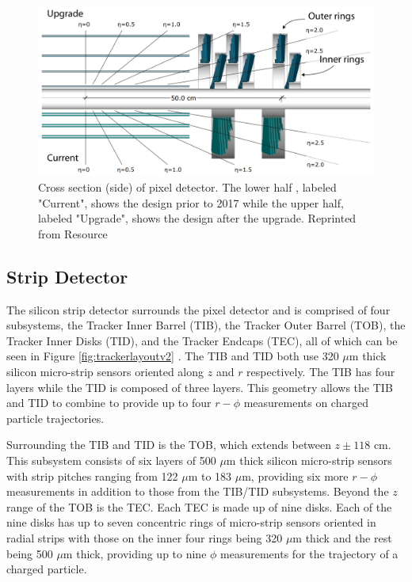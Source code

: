 \begin{figure}[h]
	\centering
	\includegraphics[width=1.0\linewidth]{Figures/Tracker_sideview}
	\caption{Cross section (side) of pixel detector. The lower half , labeled "Current", shows the design prior to 2017 while the upper half, labeled "Upgrade", shows the design after the upgrade. Reprinted from Resource \cite{Dominguez:1481838}}
	\label{fig:trackersideview}
\end{figure}

\subsection{Strip Detector}
The silicon strip detector surrounds the pixel detector and is comprised of four subsystems, the Tracker Inner Barrel (TIB), the Tracker Outer Barrel (TOB), the Tracker Inner Disks (TID), and the Tracker Endcaps (TEC), all of which can be seen in Figure \ref{fig:trackerlayoutv2} \cite{Collaboration_2008}. The TIB and TID both use 320 $\mu$m thick silicon micro-strip sensors oriented along $z$ and $r$ respectively.  The TIB has four layers while the TID is composed of three layers.  This geometry allows the TIB and TID to combine to provide up to four $r-\phi$ measurements on charged particle trajectories.

Surrounding the TIB and TID is the TOB, which extends between $z \pm 118$ cm.  This subsystem consists of six layers of 500 $\mu$m thick silicon micro-strip sensors with strip pitches ranging from 122 $\mu$m to 183 $\mu$m, providing six more $r-\phi$ measurements in addition to those from the TIB/TID subsystems. Beyond the $z$ range of the TOB is the TEC.  Each TEC is made up of nine disks.  Each of the nine disks has up to seven concentric rings of micro-strip sensors oriented in radial strips with those on the inner four rings being 320 $\mu$m thick and the rest being 500 $\mu$m thick, providing up to nine $\phi$ measurements for the trajectory of a charged particle.  

